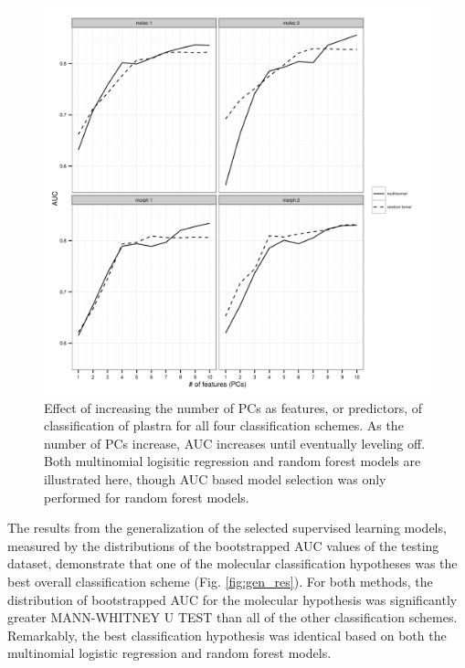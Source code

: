 \documentclass[12pt,letterpaper]{article}\usepackage{graphicx, color}
\begin{document}
\begin{figure}[ht]
  \centering
  \includegraphics[width = \textwidth]{figure/roc_sel}
  \caption{Effect of increasing the number of PCs as features, or predictors, of classification of plastra for all four classification schemes. As the number of PCs increase, AUC increases until eventually leveling off. Both multinomial logisitic regression and random forest models are illustrated here, though AUC based model selection was only performed for random forest models.}
  \label{fig:roc}
\end{figure}


The results from the generalization of the selected supervised learning models, measured by the distributions of the bootstrapped AUC values of the testing dataset, demonstrate that one of the molecular classification hypotheses was the best overall classification scheme (Fig. \ref{fig:gen_res}). For both methods, the distribution of bootstrapped AUC for the molecular hypothesis was significantly greater MANN-WHITNEY U TEST than all of the other classification schemes. Remarkably, the best classification hypothesis was identical based on both the multinomial logistic regression and random forest models.
\end{document}
